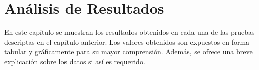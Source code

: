 \chapter{Análisis de Resultados}

En este capítulo se muestran los resultados obtenidos en cada una de las pruebas descriptas
en el capítulo anterior. Los valores obtenidos son expuestos en forma tabular y gráficamente para
su mayor comprensión. Además, se ofrece una breve explicación sobre los datos si así es requerido.





